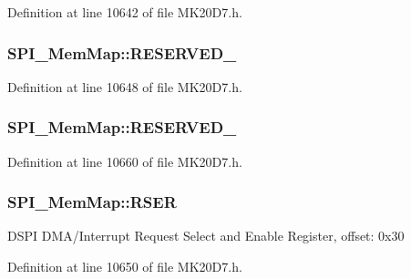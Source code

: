 Definition at line 10642 of file M\+K20\+D7.\+h.

\subsubsection[{\texorpdfstring{R\+E\+S\+E\+R\+V\+E\+D\+\_\+1}{RESERVED_1}}]{ S\+P\+I\+\_\+\+Mem\+Map\+::\+R\+E\+S\+E\+R\+V\+E\+D\+\_}\hypertarget{struct_s_p_i___mem_map_a1c32ae0599ed57b9467bdd9d1c9f5e8d}{}\label{struct_s_p_i___mem_map_a1c32ae0599ed57b9467bdd9d1c9f5e8d}


Definition at line 10648 of file M\+K20\+D7.\+h.

\subsubsection[{\texorpdfstring{R\+E\+S\+E\+R\+V\+E\+D\+\_\+2}{RESERVED_2}}]{ S\+P\+I\+\_\+\+Mem\+Map\+::\+R\+E\+S\+E\+R\+V\+E\+D\+\_}\hypertarget{struct_s_p_i___mem_map_aa88d3f450834117e7383955084f24d83}{}\label{struct_s_p_i___mem_map_aa88d3f450834117e7383955084f24d83}


Definition at line 10660 of file M\+K20\+D7.\+h.

\subsubsection[{\texorpdfstring{R\+S\+ER}{RSER}}]{ S\+P\+I\+\_\+\+Mem\+Map\+::\+R\+S\+ER}\hypertarget{struct_s_p_i___mem_map_ade8f75b925a50f74a9fb2456bc35823d}{}\label{struct_s_p_i___mem_map_ade8f75b925a50f74a9fb2456bc35823d}
D\+S\+PI D\+M\+A/\+Interrupt Request Select and Enable Register, offset\+: 0x30 

Definition at line 10650 of file M\+K20\+D7.\+h.

